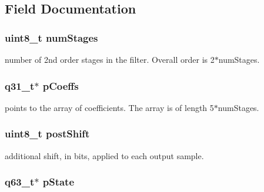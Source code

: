 \subsection{Field Documentation}
\hypertarget{structarm__biquad__cas__df1__32x64__ins__q31_a3615af038f56917909e0370c11bc2ec7}{
\subsubsection[{num\-Stages}]{\setlength{\rightskip}{0pt plus 5cm}uint8\-\_\-t num\-Stages}}\label{structarm__biquad__cas__df1__32x64__ins__q31_a3615af038f56917909e0370c11bc2ec7}
number of 2nd order stages in the filter. Overall order is 2$\ast$num\-Stages. \hypertarget{structarm__biquad__cas__df1__32x64__ins__q31_a68888e36167d81cb7836db10367a1682}{
\subsubsection[{p\-Coeffs}]{\setlength{\rightskip}{0pt plus 5cm}q31\-\_\-t$\ast$ p\-Coeffs}}\label{structarm__biquad__cas__df1__32x64__ins__q31_a68888e36167d81cb7836db10367a1682}
points to the array of coefficients. The array is of length 5$\ast$num\-Stages. \hypertarget{structarm__biquad__cas__df1__32x64__ins__q31_a74050e9f36542bd56f4052381a82ae8f}{
\subsubsection[{post\-Shift}]{\setlength{\rightskip}{0pt plus 5cm}uint8\-\_\-t post\-Shift}}\label{structarm__biquad__cas__df1__32x64__ins__q31_a74050e9f36542bd56f4052381a82ae8f}
additional shift, in bits, applied to each output sample. \hypertarget{structarm__biquad__cas__df1__32x64__ins__q31_adefeb77301cc04e4d7d22f323029d588}{
\subsubsection[{p\-State}]{\setlength{\rightskip}{0pt plus 5cm}q63\-\_\-t$\ast$ p\-State}}\label{structarm__biquad__cas__df1__32x64__ins__q31_adefeb77301cc04e4d7d22f323029d588}
